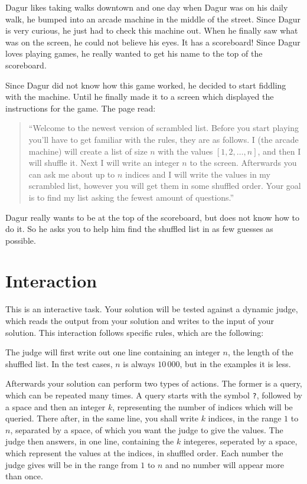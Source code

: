 
Dagur likes taking walks downtown and one day when Dagur was on his daily walk, he bumped into an
arcade machine in the middle of the street. Since Dagur is very curious, he just had to check this
machine out. When he finally saw what was on the screen, he could not believe his eyes. It has a scoreboard!
Since Dagur loves playing games, he really wanted to get his name to the top of the scoreboard.

Since Dagur did not know how this game worked, he decided to start fiddling with the machine.
Until he finally made it to a screen which displayed the instructions for the game.
The page read:

\begin{quote}
``Welcome to the newest version of scrambled list. Before you start playing you'll have
to get familiar with the rules, they are as follows. I (the arcade machine) will create a list of size $n$
with the values $[1, 2, \dots, n]$, and then I will shuffle it. Next I will write an integer $n$ to the screen.
Afterwards you can ask me about up to $n$ indices and I will write the values in my scrambled list, however
you will get them in some shuffled order. Your goal is to find my list asking the fewest amount of questions.''
\end{quote}

Dagur really wants to be at the top of the scoreboard, but does not know how to do it.
So he asks you to help him find the shuffled list in as few guesses as possible.

\section*{Interaction}
This is an interactive task. Your solution will be tested against a dynamic judge, which reads
the output from your solution and writes to the input of your solution.
This interaction follows specific rules, which are the following:

The judge will first write out one line containing an integer $n$, the length of the shuffled list.
In the test cases, $n$ is always $10\,000$, but in the examples it is less.

Afterwards your solution can perform two types of actions.
The former is a query, which can be repeated many times.
A query starts with the symbol \texttt{?}, followed by a space and then an integer $k$, representing the 
number of indices which will be queried. There after, in the same line, you shall write $k$ indices,
in the range $1$ to $n$, separated by a space, of which you want the judge to give the values.
The judge then answers, in one line, containing the $k$ integeres, seperated by a space,
which represent the values at the indices, in shuffled order. Each number the judge gives
will be in the range from $1$ to $n$ and no number will appear more than once.

